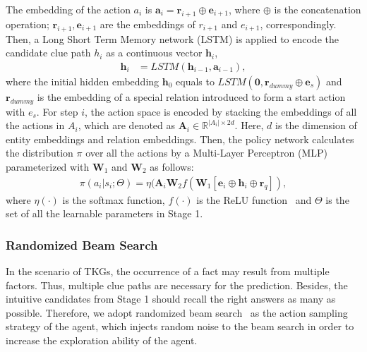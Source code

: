 \documentclass[11pt,a4paper]{article}
\begin{document}
The embedding of the action $a_i$ is $\mathbf{a}_i =\mathbf{r}_{i+1}\oplus
\mathbf{e}_{i+1}$, where $\oplus$ is the concatenation operation;
$\mathbf{r}_{i+1}, \mathbf{e}_{i+1}$ are the embeddings of $r_{i+1}$ and
$e_{i+1}$, correspondingly. Then, a Long Short Term Memory network (LSTM) is
applied to encode the candidate clue path $h_i$ as a continuous vector
$\mathbf{h}_{i}$, 
\begin{align} 
\mathbf{h}_{i} &= LSTM(\mathbf{h}_{i-1}, \mathbf{a}_{i-1}),
\end{align}
where the initial hidden embedding $\mathbf{h}_{0}$ equals to $LSTM(\mathbf{0},
\mathbf{r}_{dummy}\oplus \mathbf{e}_{s})$ and $\mathbf{r}_{dummy}$ is the embedding
of a special relation introduced to form a start action with $e_{s}$. For step
$i$, the action space is encoded by stacking the embeddings of all the actions
in $A_{i}$, which are denoted as $\mathbf{A}_{i} \in \mathbb{R}^{|A_i| \times
{2d}}$. Here, $d$ is the dimension of entity embeddings and relation embeddings.
Then, the policy network calculates the distribution $\pi$ over all the actions
by a Multi-Layer Perceptron (MLP) parameterized with $\mathbf{W}_{1}$ and
$\mathbf{W}_{2}$ as follows:
%
\begin{align}
\pi(a_{i}|s_{i};\! \Theta)\!=\!\eta(\!\mathbf{A}_{i}\mathbf{W}_{2}f(\mathbf{W}_{1}[\mathbf{e}_{i}\oplus\mathbf{h}_{i}\oplus\mathbf{r}_{q}]),\!\!\label{policy}
\end{align}
where $\eta(\cdot)$ is the softmax function, $f(\cdot)$ is the ReLU function~\cite{glorot2011deep} and $
\Theta$ is the set of all the learnable parameters in Stage 1.
% 

\subsubsection{Randomized Beam Search}
In the scenario of TKGs, the occurrence of a fact may result from
multiple factors. Thus, multiple clue paths are necessary for the prediction.
Besides, the intuitive candidates from Stage 1 should recall the right answers
as many as possible. Therefore, we adopt randomized beam
search~\cite{sutskever2014sequence, guu2017language, wu2018study} as the action
sampling strategy of the agent, which injects random noise to the beam search in
order to increase the exploration ability of the agent.
\end{document}
